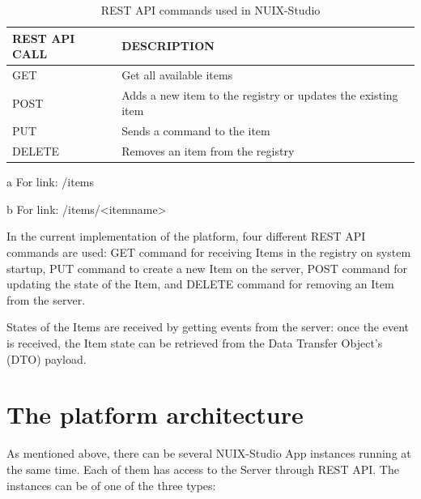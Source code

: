 \begin{table}
  \centering
  \begin{threeparttable}[c]
    \caption{REST API commands used in NUIX-Studio}
    \label{tab:rest-api-table}
    \begin{tabular}{ll}
      \toprule
      REST API CALL    &         DESCRIPTION                 \\
      \midrule
      GET\tnote{a} & Get all available items \\
      POST\tnote{b} & Adds a new item to the registry or updates the existing item    \\
      PUT\tnote{b}        & Sends a command to the item                              \\
      DELETE\tnote{b}        & Removes an item from the registry          \\
      \bottomrule
    \end{tabular}
    \begin{tablenotes}
      \item [a] For link: /items
      \item [b] For link: /items/<itemname>
    \end{tablenotes}
  \end{threeparttable}
\end{table}

In the current implementation of the platform, four different REST API commands are used: GET command for receiving Items in the registry on system startup, PUT command to create a new Item on the server, POST command for updating the state of the Item, and DELETE command for removing an Item from the server.

States of the Items are received by getting events from the server: once the event is received, the Item state can be retrieved from the Data Transfer Object's (DTO) payload.

\section{The platform architecture}

As mentioned above, there can be several NUIX-Studio App instances running at the same time. Each of them has access to the Server through REST API. The instances can be of one of the three types:

